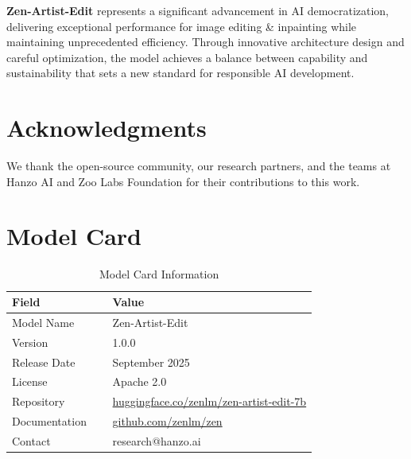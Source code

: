 \documentclass[11pt,a4paper]{article}
\begin{document}
\textbf{Zen-Artist-Edit} represents a significant advancement in AI democratization, 
delivering exceptional performance for image editing \&   inpainting while maintaining 
unprecedented efficiency. Through innovative architecture design and careful optimization, 
the model achieves a balance between capability and sustainability that sets a new standard 
for responsible AI development.

\section*{Acknowledgments}

We thank the open-source community, our research partners, and the teams at Hanzo AI and 
Zoo Labs Foundation for their contributions to this work.

\appendix

\section{Model Card}

\begin{table}[H]
\centering
\begin{tabular}{ll}
\toprule
\textbf{Field} \ \ &   \textbf{Value} \\
\midrule
Model Name \ \ &   Zen-Artist-Edit \\
Version \ \ &   1.0.0 \\
Release Date \ \ &   September 2025 \\
License \ \ &   Apache 2.0 \\
Repository \ \ &   \href{https://huggingface.co/zenlm/zen-artist-edit-7b}{huggingface.co/zenlm/zen-artist-edit-7b} \\
Documentation \ \ &   \href{https://github.com/zenlm/zen}{github.com/zenlm/zen} \\
Contact \ \ &   research@hanzo.ai \\
\bottomrule
\end{tabular}
\caption{Model Card Information}
\end{table}
\end{document}
